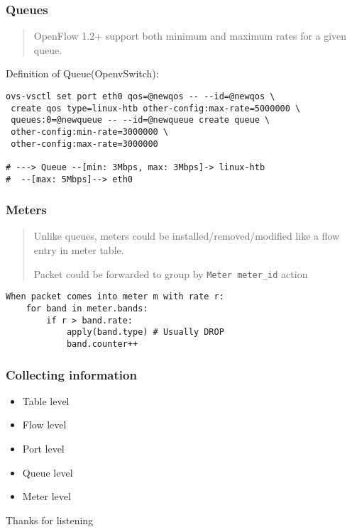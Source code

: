 \documentclass{beamer}
\begin{document}
\begin{frame}[fragile]
    \frametitle{Queues}
    \begin{quotation}
        OpenFlow 1.2+ support both minimum and maximum rates for a given queue.
    \end{quotation}
    Definition of Queue(OpenvSwitch):
\begin{verbatim}
ovs-vsctl set port eth0 qos=@newqos -- --id=@newqos \
 create qos type=linux-htb other-config:max-rate=5000000 \
 queues:0=@newqueue -- --id=@newqueue create queue \
 other-config:min-rate=3000000 \
 other-config:max-rate=3000000

# ---> Queue --[min: 3Mbps, max: 3Mbps]-> linux-htb
#  --[max: 5Mbps]--> eth0
\end{verbatim}
\end{frame}

\begin{frame}[fragile]
    \frametitle{Meters}
    \begin{quotation}
    Unlike queues, meters could be installed/removed/modified like a flow entry in meter table.
    
    Packet could be forwarded to group by \texttt{Meter meter\_id} action
    \end{quotation}
\begin{verbatim}
When packet comes into meter m with rate r:
    for band in meter.bands:
        if r > band.rate:
            apply(band.type) # Usually DROP
            band.counter++
\end{verbatim}
\end{frame}

\begin{frame}
    \frametitle{Collecting information}
    \begin{itemize}
        \item Table level
        \item Flow level
        \item Port level
        \item Queue level
        \item Meter level
    \end{itemize}
\end{frame}

\begin{frame}[standout]
    Thanks for listening
\end{frame}
\end{document}

